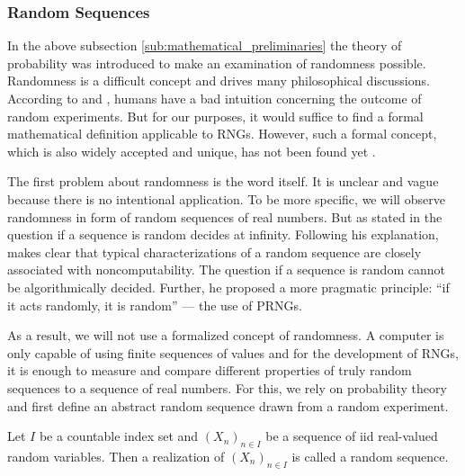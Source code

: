 \documentclass{stdlocal}
\begin{document}
    \subsubsection*{Random Sequences}
    In the above subsection \ref{sub:mathematical_preliminaries} the theory of probability was introduced to make an examination of randomness possible.
    Randomness is a difficult concept and drives many philosophical discussions.
    According to \textcite{volchan2002} and \textcite[\ppno~10-11]{kneusel2018}, humans have a bad intuition concerning the outcome of random experiments.
    But for our purposes, it would suffice to find a formal mathematical definition applicable to RNGs.
    However, such a formal concept, which is also widely accepted and unique, has not been found yet \autocite{volchan2002}.

    The first problem about randomness is the word itself.
    It is unclear and vague because there is no intentional application.
    To be more specific, we will observe randomness in form of random sequences of real numbers.
    But as stated in \textcite{volchan2002} the question if a sequence is random decides at infinity.
    Following his explanation, \textcite{volchan2002} makes clear that typical characterizations of a random sequence are closely associated with noncomputability.
    The question if a sequence is random cannot be algorithmically decided.
    Further, he proposed a more pragmatic principle: \enquote{if it acts randomly, it is random} --- the use of PRNGs.

    As a result, we will not use a formalized concept of randomness.
    A computer is only capable of using finite sequences of values and for the development of RNGs, it is enough to measure and compare different properties of truly random sequences to a sequence of real numbers.
    For this, we rely on probability theory and first define an abstract random sequence drawn from a random experiment.

    \begin{definition}
      Let $I$ be a countable index set and $(X_n)_{n\in I}$ be a sequence of iid real-valued random variables.
      Then a realization of $(X_n)_{n\in I}$ is called a random sequence.
    \end{definition}

\end{document}
